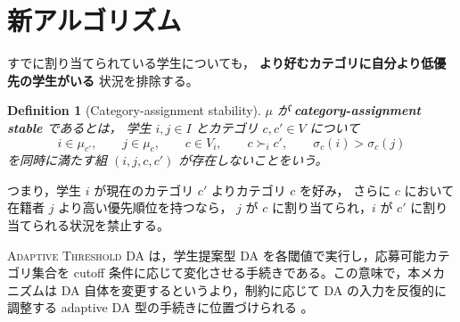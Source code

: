 \documentclass[
  12pt,
  a4paper,
  oneside,
  onecolumn,
  titlepage,
  final
]{jsarticle}
\newtheorem{definition}{Definition}
\newcommand{\1}{\mathbf{1}}
\begin{document}


\section{新アルゴリズム}


すでに割り当てられている学生についても，
\textbf{より好むカテゴリに自分より低優先の学生がいる}
状況を排除する。

\begin{definition}[Category-assignment stability]
$\mu$ が \textbf{category-assignment stable} であるとは，
学生 $i,j\in I$ とカテゴリ $c,c'\in V$ について
\[
i\in\mu_{c'},
\qquad
j\in\mu_c,
\qquad
c\in V_i,
\qquad
c\succ_i c',
\qquad
\sigma_c(i)>\sigma_c(j)
\]
を同時に満たす組 $(i,j,c,c')$ が存在しないことをいう。
\end{definition}

\vspace{0.5em}
つまり，学生 $i$ が現在のカテゴリ $c'$ よりカテゴリ $c$ を好み，
さらに $c$ において在籍者 $j$ より高い優先順位を持つなら，
$j$ が $c$ に割り当てられ，$i$ が $c'$ に割り当てられる状況を禁止する。

\textsc{Adaptive Threshold DA} は，学生提案型 DA
\citep{GaSh62a,Roth08a} を各閾値で実行し，応募可能カテゴリ集合を
cutoff 条件に応じて変化させる手続きである。この意味で，本メカニズムは
DA 自体を変更するというより，制約に応じて DA の入力を反復的に調整する
adaptive DA 型の手続きに位置づけられる
\citep{RKG21a}。
\end{document}
